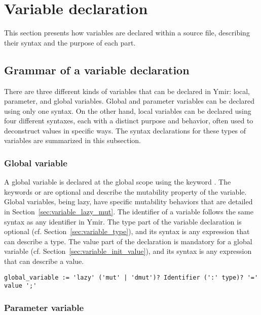 \section{Variable declaration}
\label{sec:local_variable_declaration}

This section presents how variables are declared within a source file,
describing their syntax and the purpose of each part.

\subsection{Grammar of a variable declaration}

There are three different kinds of variables that can be declared in Ymir:
local, parameter, and global variables. Global and parameter variables can be
declared using only one syntax. On the other hand, local variables can be
declared using four different syntaxes, each with a distinct purpose and
behavior, often used to deconstruct values in specific ways. The syntax
declarations for these types of variables are summarized in this subsection.

\subsubsection*{Global variable}

A global variable is declared at the global scope using the keyword
. The keywords  or  are optional and describe
the mutability property of the variable. Global variables, being lazy, have
specific mutability behaviors that are detailed in
Section~\ref{sec:variable_lazy_mut}. The identifier of a variable follows the
same syntax as any identifier in Ymir. The type part of the variable declaration
is optional (cf. Section~\ref{sec:variable_type}), and its syntax is any
expression that can describe a type. The value part of the declaration is
mandatory for a global variable (cf. Section~\ref{sec:variable_init_value}), and
its syntax is any expression that can describe a value.

\begin{lstlisting}[style=bashVerb]
global_variable := 'lazy' ('mut' | 'dmut')? Identifier (':' type)? '=' value ';'
\end{lstlisting}

\subsubsection*{Parameter variable}

